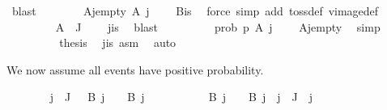 \begin{isabellebody}
\ blast\isanewline
\ \ \ \ \ \ \isamarkupfalse%
\ A{\isacharunderscore}{\kern0pt}j{\isacharunderscore}{\kern0pt}empty{\isacharcolon}{\kern0pt}\ {\isachardoublequoteopen}A\ j\ {\isacharequal}{\kern0pt}\ {\isacharbraceleft}{\kern0pt}{\isacharbraceright}{\kern0pt}{\isachardoublequoteclose}\ \isamarkupfalse%
\ B{\isacharunderscore}{\kern0pt}is\ \isamarkupfalse%
\ {\isacharparenleft}{\kern0pt}force\ simp\ add{\isacharcolon}{\kern0pt}\ toss{\isacharunderscore}{\kern0pt}def\ vimage{\isacharunderscore}{\kern0pt}def{\isacharparenright}{\kern0pt}\isanewline
\ \ \ \ \ \ \isamarkupfalse%
\ {\isachardoublequoteopen}{\isasymInter}\ {\isacharparenleft}{\kern0pt}A\ {\isacharbackquote}{\kern0pt}\ J{\isacharparenright}{\kern0pt}\ {\isacharequal}{\kern0pt}\ {\isacharbraceleft}{\kern0pt}{\isacharbraceright}{\kern0pt}{\isachardoublequoteclose}\ \isamarkupfalse%
\ j{\isacharunderscore}{\kern0pt}is\ \isamarkupfalse%
\ blast\isanewline
\ \ \ \ \ \ \isamarkupfalse%
\ \isamarkupfalse%
\ {\isachardoublequoteopen}prob\ p\ {\isacharparenleft}{\kern0pt}A\ j{\isacharparenright}{\kern0pt}\ {\isacharequal}{\kern0pt}\ {}{\isachardoublequoteclose}\ \isamarkupfalse%
\ A{\isacharunderscore}{\kern0pt}j{\isacharunderscore}{\kern0pt}empty\ \isamarkupfalse%
\ simp\isanewline
\ \ \ \ \ \ \isamarkupfalse%
\ \isamarkupfalse%
\ {\isacharquery}{\kern0pt}thesis\ \isamarkupfalse%
\ j{\isacharunderscore}{\kern0pt}is\ asm{\isacharparenleft}{\kern0pt}{}{\isacharparenright}{\kern0pt}\ \isamarkupfalse%
\ auto\isanewline
\ \ \ \ \isamarkupfalse%
%
\begin{isamarkuptext}%
We now assume all events have positive probability.%
\end{isamarkuptext}\isamarkuptrue%
\ \ \ \ \ \ \isamarkupfalse%
\ {\isachardoublequoteopen}{\isasymnot}{\isacharparenleft}{\kern0pt}{\isasymexists}j\ {\isasymin}\ J{\isachardot}{\kern0pt}\ {}\ {\isasymnotin}\ B\ j\ {\isasymand}\ {\isacharminus}{\kern0pt}{}\ {\isasymnotin}\ B\ j{\isacharparenright}{\kern0pt}{\isachardoublequoteclose}\isanewline
\ \ \ \ \ \ \isamarkupfalse%
\ {\isacharasterisk}{\kern0pt}{\isacharcolon}{\kern0pt}\ {\isachardoublequoteopen}{}\ {\isasymin}\ B\ j\ {\isasymor}\ {\isacharminus}{\kern0pt}{}\ {\isasymin}\ B\ j{\isachardoublequoteclose}\ \ {\isachardoublequoteopen}j\ {\isasymin}\ J{\isachardoublequoteclose}\ \ j\ \isamarkupfalse%

\end{isabellebody}
